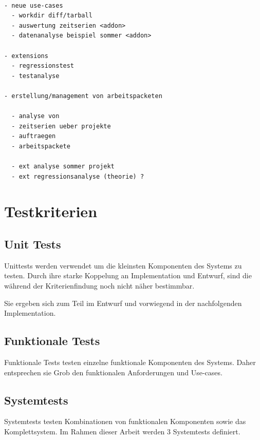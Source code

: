 \begin{verbatim}

- neue use-cases
  - workdir diff/tarball
  - auswertung zeitserien <addon>
  - datenanalyse beispiel sommer <addon>

- extensions
  - regressionstest
  - testanalyse

- erstellung/management von arbeitspacketen

  - analyse von
  - zeitserien ueber projekte
  - auftraegen
  - arbeitspackete

  - ext analyse sommer projekt
  - ext regressionsanalyse (theorie) ?
\end{verbatim}





\section{Testkriterien}
\subsection{Unit Tests}

Unittests werden verwendet um die kleinsten Komponenten des Systems zu testen.
Durch ihre starke Koppelung an Implementation und Entwurf,
sind die w\"ahrend der Kriterienfindung noch nicht n\"aher bestimmbar.

Sie ergeben sich zum Teil im Entwurf und vorwiegend in
der nachfolgenden Implementation.

\subsection{Funktionale Tests}

Funktionale Tests testen einzelne funktionale Komponenten des Systems.
Daher entsprechen sie Grob den funktionalen Anforderungen und Use-cases.

\subsection{Systemtests}

Systemtests testen Kombinationen von funktionalen Komponenten sowie das Komplettsystem.
Im Rahmen dieser Arbeit werden 3 Systemtests definiert.


